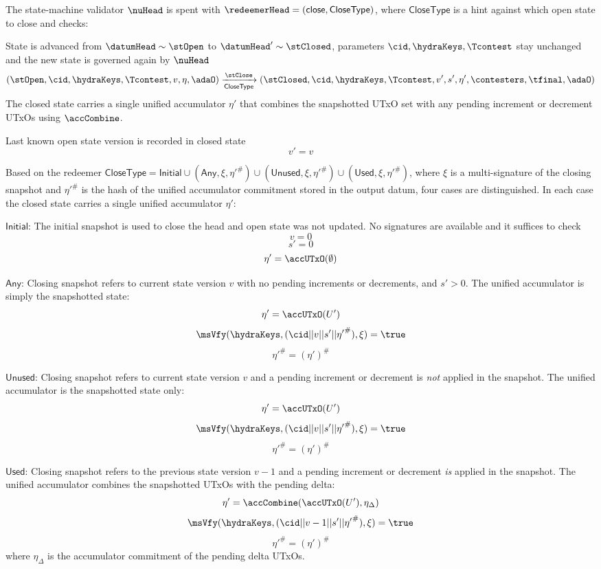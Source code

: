 \noindent The state-machine validator $\nuHead$ is spent with
$\redeemerHead = (\mathsf{close}, \mathsf{CloseType})$, where
$\mathsf{CloseType}$ is a hint against which open state to close and checks:
\begin{menumerate}
	\item State is advanced from $\datumHead \sim \stOpen$ to
	$\datumHead' \sim \stClosed$, parameters $\cid,\hydraKeys,\Tcontest$
	stay unchanged and the new state is governed again by $\nuHead$
	\[
		(\stOpen,\cid,\hydraKeys,\Tcontest,v,\eta,\adaO) \xrightarrow[\mathsf{CloseType}]{\stClose} (\stClosed,\cid,\hydraKeys,\Tcontest,v',s',\eta', \contesters,\tfinal,\adaO)
	\]
	The closed state carries a single unified accumulator $\eta'$ that combines the snapshotted UTxO set with any pending increment or decrement UTxOs using $\accCombine$.
	\item Last known open state version is recorded in closed state
	\[
		v' = v
	\]

	\item Based on the redeemer $\mathsf{CloseType} = \mathsf{Initial} \cup (\mathsf{Any}, \xi, {\eta'}^{\#}) \cup (\mathsf{Unused}, \xi, {\eta'}^{\#}) \cup (\mathsf{Used}, \xi, {\eta'}^{\#})$, where $\xi$ is a multi-signature of the closing snapshot and ${\eta'}^{\#}$ is the hash of the unified accumulator commitment stored in the output datum, four cases are distinguished. In each case the closed state carries a single unified accumulator $\eta'$:
	\begin{menumerate}
		\item $\mathsf{Initial}$: The initial snapshot is used to close the head and open state was not updated. No signatures are available and it suffices to check
		\[
			v = 0
		\]
		\[
			s' = 0
		\]
		\[
			\eta' = \accUTxO(\emptyset)
		\]
		\item $\mathsf{Any}$: Closing snapshot refers to current state version $v$ with no pending increments or decrements, and $s' > 0$. The unified accumulator is simply the snapshotted state:
		\[
			\eta' = \accUTxO(U')
		\]
		\[
			\msVfy(\hydraKeys,(\cid || v || s' || {\eta'}^{\#}),\xi) = \true
		\]
		\[
			{\eta'}^{\#} = (\eta')^{\#}
		\]
		\item $\mathsf{Unused}$: Closing snapshot refers to current state version $v$ and a pending increment or decrement is \emph{not} applied in the snapshot. The unified accumulator is the snapshotted state only:
		\[
			\eta' = \accUTxO(U')
		\]
		\[
			\msVfy(\hydraKeys,(\cid || v || s' || {\eta'}^{\#}),\xi) = \true
		\]
		\[
			{\eta'}^{\#} = (\eta')^{\#}
		\]
		\item $\mathsf{Used}$: Closing snapshot refers to the previous state version $v - 1$ and a pending increment or decrement \emph{is} applied in the snapshot. The unified accumulator combines the snapshotted UTxOs with the pending delta:
		\[
			\eta' = \accCombine(\accUTxO(U'), \eta_\Delta)
		\]
		\[
			\msVfy(\hydraKeys,(\cid || v - 1 || s' || {\eta'}^{\#}),\xi) = \true
		\]
		\[
			{\eta'}^{\#} = (\eta')^{\#}
		\]
		where $\eta_\Delta$ is the accumulator commitment of the pending delta UTxOs.
	\end{menumerate}


\end{menumerate}
